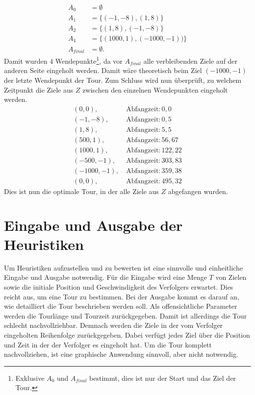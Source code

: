\documentclass[german,version-2019-11]{uzl-thesis}
\begin{document}
\begin{example}
\begin{align*}
A_0&=\emptyset\\
A_1&=\{(-1, -8), (1, 8)\}\\
A_2&=\{(1, 8), (-1, -8)\}\\ 
A_4&=\{(1000, 1), (-1000, -1))\}\\
A_{final}&=\emptyset.
\end{align*}
Damit wurden $4$ Wendepunkte\footnote{Exklusive $A_0$ und $A_{final}$ bestimmt, dies ist nur der Start und das Ziel der Tour.}, da vor $A_{final}$ alle verbleibenden Ziele auf der anderen Seite eingeholt werden. Damit wäre theoretisch beim Ziel $(-1000,-1)$ der letzte Wendepunkt der Tour. Zum Schluss wird nun überprüft, zu welchem Zeitpunkt die Ziele aus $Z$ zwischen den einzelnen Wendepunkten eingeholt werden.
\begin{align*}
(0, 0),~ &\text{Abfangzeit}: 0,0 \\
(-1, -8),~ &\text{Abfangzeit}: 0,5 \\
(1, 8),~ &\text{Abfangzeit}: 5,5 \\
(500, 1),~ &\text{Abfangzeit}: 56,67 \\
(1000, 1),~ &\text{Abfangzeit}: 122,22 \\
(-500, -1),~ &\text{Abfangzeit}: 303,83 \\
(-1000, -1),~ &\text{Abfangzeit}: 359,38 \\
(0, 0),~ &\text{Abfangzeit}: 495,32
\end{align*}
Dies ist nun die optimale Tour, in der alle Ziele aus $Z$ abgefangen wurden.

\end{example}

\section{Eingabe und Ausgabe der Heuristiken}

Um Heuristiken aufzustellen und zu bewerten ist eine sinnvolle und einheitliche Eingabe und Ausgabe notwendig. Für die Eingabe wird eine Menge $T$ von Zielen sowie die initiale Position und Geschwindigkeit des Verfolgers erwartet. Dies reicht aus, um eine Tour zu bestimmen. 
Bei der Ausgabe kommt es darauf an, wie detailliert die Tour beschrieben werden soll. Als offensichtliche Parameter werden die Tourlänge und Tourzeit zurückgegeben. Damit ist allerdings die Tour schlecht nachvollziehbar. Demnach werden die Ziele in der vom Verfolger eingeholten Reihenfolge zurückgegeben. Dabei verfügt jedes Ziel über die Position und Zeit in der der Verfolger es eingeholt hat. Um die Tour komplett nachvollziehen, ist eine graphische Anwendung sinnvoll, aber nicht notwendig. 
\end{document}
